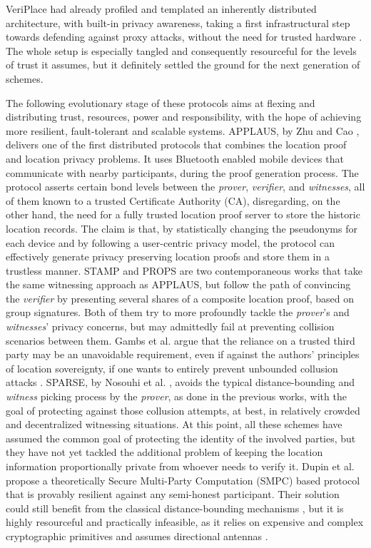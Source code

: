 VeriPlace had already profiled and templated an inherently distributed architecture, with built-in privacy awareness, taking a first infrastructural step towards defending against proxy attacks, without the need for trusted hardware \cite{luo2010veriplace}. The whole setup is especially tangled and consequently resourceful for the levels of trust it assumes, but it definitely settled the ground for the next generation of \pol{} schemes. 

The following evolutionary stage of these protocols aims at flexing and distributing trust, resources, power and responsibility, with the hope of achieving more resilient, fault-tolerant and scalable systems. APPLAUS, by Zhu and Cao \cite{zhu2011applaus}, delivers one of the first distributed protocols that combines the location proof and location privacy problems. It uses Bluetooth enabled mobile devices that communicate with nearby participants, during the proof generation process. The protocol asserts certain bond levels between the \emph{prover}, \emph{verifier}, and \emph{witnesses}, all of them known to a trusted Certificate Authority (CA), disregarding, on the other hand, the need for a fully trusted location proof server to store the historic location records. The claim is that, by statistically changing the pseudonyms for each device and by following a user-centric privacy model, the protocol can effectively generate privacy preserving location proofs and store them in a trustless manner. STAMP \cite{wang2016stamp} and PROPS \cite{gambs2014props} are two contemporaneous works that take the same witnessing approach as APPLAUS, but follow the path of convincing the \emph{verifier} by presenting several shares of a composite location proof, based on group signatures. Both of them try to more profoundly tackle the \emph{prover}'s and \emph{witnesses}' privacy concerns, but may admittedly fail at preventing collision scenarios between them. Gambs et al. argue that the reliance on a trusted third party may be an unavoidable requirement, even if against the authors' principles of location sovereignty, if one wants to entirely prevent unbounded collusion attacks \cite{gambs2014props}. SPARSE, by Nosouhi et al. \cite{nosouhi2018sparse}, avoids the typical distance-bounding and \emph{witness} picking process by the \emph{prover}, as done in the previous works, with the goal of protecting against those collusion attempts, at best, in relatively crowded and decentralized witnessing situations. At this point, all these schemes have assumed the common goal of protecting the identity of the involved parties, but they have not yet tackled the additional problem of keeping the location information proportionally private from whoever needs to verify it. Dupin et al. \cite{dupin2018location} propose a theoretically Secure Multi-Party Computation (SMPC) based protocol that is provably resilient against any semi-honest participant. Their solution could still benefit from the classical distance-bounding mechanisms \cite{dupin2018location}, but it is highly resourceful and practically infeasible, as it relies on expensive and complex cryptographic primitives and assumes directional antennas \cite{yang2021group}.


